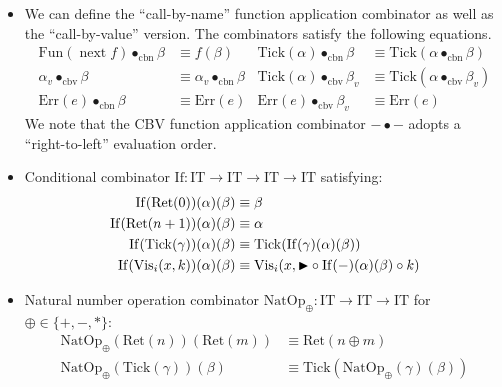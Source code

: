 \documentclass{article}
\theoremstyle{definition}
\theoremstyle{plain}
\theoremstyle{remark}
\newcommand{\IT}{\mathrm{IT}}
\newcommand{\gRet}{\mathrm{Ret}}
\newcommand{\gErr}{\mathrm{Err}}
\newcommand{\gVis}{\mathrm{Vis}}
\newcommand{\gFun}{\mathrm{Fun}}
\newcommand{\Tick}{\mathrm{Tick}}
\DeclareMathOperator*{\Next}{\mathrm{next}}
\newcommand{\getfun}{\mathrm{get\_fun}}
\newcommand{\getval}{\mathrm{get\_val}}
\newcommand{\cbnap}{\bullet_{\text{cbn}}}
\newcommand{\cbvap}{\bullet_{\text{cbv}}}
\newcommand{\gnatop}[1]{\mathrm{NatOp}_{#1}}
\newcommand{\gif}{\mathrm{If}}
\begin{document}
\begin{itemize}
\begin{align*}
      \getfun(g)(\gFun(h))        &\equiv g\;h
        & \getfun(g)(\gErr(e))    &\equiv \gErr(e) \\
      \getfun(g)(\Tick(\alpha))   &\equiv \Tick(\getfun(g)(\alpha))
        & \getfun(g)(\gVis_i(x,k))&\equiv \gVis_i(x, \latert\circ\getfun(g)\circ k) \\[6pt]
      \getval(h)(\gRet(n))        &\equiv h(\gRet(n))
        & \getval(h)(\gFun(f))    &\equiv h(\gFun(f)) \\
      \getval(h)(\Tick(\alpha))   &\equiv \Tick(\getval(h)(\alpha))
        & \getval(h)(\gVis_i(x,k))&\equiv \gVis_i(x, \latert\circ\getval(h)\circ k)
    \end{align*}
  \item We can define the ``call-by-name'' function application combinator as well as the ``call-by-value'' version.
    The combinators satisfy the following equations.
    \begin{align*}
      \gFun(\Next f)\cbnap\beta &\equiv f(\beta)
        & \Tick(\alpha)\cbnap\beta &\equiv \Tick(\alpha\cbnap\beta) \\
      \alpha_v\cbvap\beta          &\equiv \alpha_v\cbnap\beta
        & \Tick(\alpha)\cbvap\beta_v &\equiv \Tick(\alpha\cbvap\beta_v) \\
      \gErr(e)\cbnap\beta &\equiv \gErr(e)
        & \gErr(e)\cbvap\beta_v    &\equiv \gErr(e)
    \end{align*}
    We note that the CBV function application combinator \(- \bullet - \) adopts a ``right-to-left'' evaluation order.
  \item Conditional combinator \(\gif : \IT \to \IT \to \IT \to \IT\) satisfying:
    \begin{align*}
      \gif(\gRet(0))(\alpha)(\beta)   &\equiv \beta \\
      \gif(\gRet(n+1))(\alpha)(\beta) &\equiv \alpha \\
      \gif(\Tick(\gamma))(\alpha)(\beta) &\equiv \Tick(\gif(\gamma)(\alpha)(\beta)) \\
      \gif(\gVis_i(x,k))(\alpha)(\beta) &\equiv
         \gVis_i(x,\latert\circ\gif(-)(\alpha)(\beta)\circ k)
    \end{align*}
  \item Natural number operation combinator
    \(\gnatop{\oplus} : \IT \to \IT \to \IT\) for
    \(\oplus\in\{+,-,*\}\):
    \begin{align*}
      \gnatop{\oplus}(\gRet(n))(\gRet(m)) &\equiv \gRet({n}\oplus {m}) \\
      \gnatop{\oplus}(\Tick(\gamma))(\beta)  &\equiv \Tick(\gnatop{\oplus}(\gamma)(\beta)) \\

\end{align*}
\end{itemize}
\end{document}

